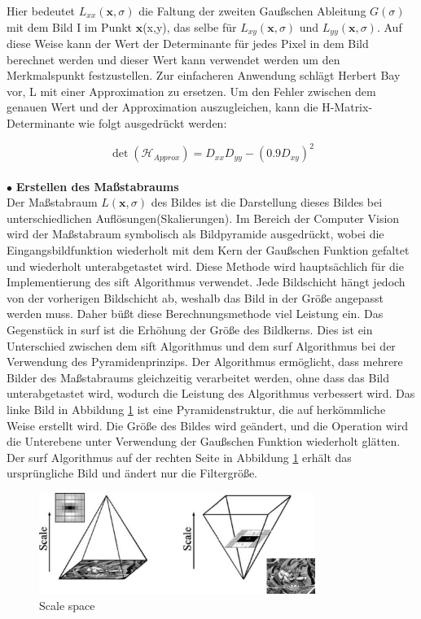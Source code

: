 Hier bedeutet $L_{xx}(\textbf{x},\sigma)$ die Faltung der zweiten Gaußschen Ableitung $G(\sigma)$ mit dem Bild I im Punkt $\textbf{x}$(x,y), das selbe für $L_{xy}(\textbf{x},\sigma)$ und $L_{yy}(\textbf{x},\sigma)$. Auf diese Weise kann der Wert der Determinante für jedes Pixel in dem Bild berechnet werden und dieser Wert kann verwendet werden um den Merkmalspunkt festzustellen.
Zur einfacheren Anwendung schlägt Herbert Bay\cite{Surf} vor, L mit einer Approximation zu ersetzen. Um den Fehler zwischen dem genauen Wert und der Approximation auszugleichen, kann die H-Matrix-Determinante wie folgt ausgedrückt werden:

\begin{equation}
   \det(\mathcal{H}_{Approx}) = D_{xx}D_{yy} - (0.9D_{xy})^2  
\end{equation}
\\
$\bullet$ \textbf{Erstellen des Maßstabraums}\\
Der Maßstabraum $L(\textbf{x},\sigma)$ des Bildes ist die Darstellung dieses Bildes bei unterschiedlichen Auflösungen(Skalierungen). Im Bereich der Computer Vision wird der Maßstabraum symbolisch als Bildpyramide ausgedrückt, wobei die Eingangsbildfunktion wiederholt mit dem Kern der Gaußschen Funktion gefaltet und wiederholt unterabgetastet wird. Diese Methode wird hauptsächlich für die Implementierung des \gls{sift} Algorithmus verwendet. Jede Bildschicht hängt jedoch von der vorherigen Bildschicht ab, weshalb das Bild in der Größe angepasst werden muss. Daher büßt diese Berechnungsmethode viel Leistung ein. Das Gegenstück in \gls{surf} ist die Erhöhung der Größe des Bildkerns. Dies ist ein Unterschied zwischen dem \gls{sift} Algorithmus und dem \gls{surf} Algorithmus bei der Verwendung des Pyramidenprinzips.
Der Algorithmus ermöglicht, dass mehrere Bilder des Maßstabraums gleichzeitig verarbeitet werden, ohne dass das Bild unterabgetastet wird, wodurch die Leistung des Algorithmus verbessert wird. Das linke Bild in Abbildung \ref{fig:Scale space} ist eine Pyramidenstruktur, die auf herkömmliche Weise erstellt wird. Die Größe des Bildes wird geändert, und die Operation wird die Unterebene  unter Verwendung der Gaußschen Funktion wiederholt glätten. Der \gls{surf} Algorithmus auf der rechten Seite in Abbildung \ref{fig:Scale space} erhält das ursprüngliche Bild und ändert nur die Filtergröße.

\begin{figure}[htb]
 \centering 
 \includegraphics[keepaspectratio,width=0.8\textwidth]{images/3_Ersteverfahren/Scale_space.pdf}
 \caption{Scale space}
 \label{fig:Scale space}
\end{figure} 



